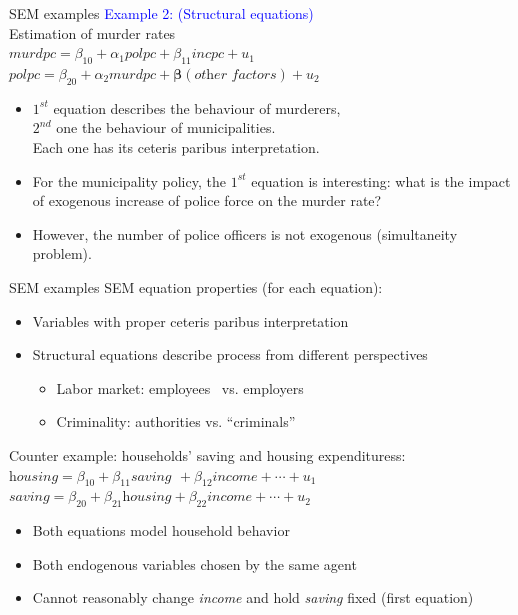 \documentclass[usenames,dvipsnames]{beamer}
\begin{document}
\begin{frame}{SEM examples}
\textcolor{Blue}{Example 2: (Structural equations)} \\Estimation of murder rates\\
\medskip
\qquad $\textit{murdpc} = \beta_{10} + \alpha_1 \textit{polpc} +  \beta_{11} \textit{incpc} + u_1$ \\
\qquad \hspace{0.25cm} $\textit{polpc} = \beta_{20} + \alpha_2 \textit{murdpc} + \bm{\beta} (\textit{other factors}) + u_2$ \\
\medskip
\begin{itemize}
\item $1^{st}$ equation describes the behaviour of murderers, \\$2^{nd}$ one the behaviour of municipalities. \\Each one has its ceteris paribus interpretation.\\
\medskip
\item For the municipality policy, the $1^{st}$ equation is interesting: what is the impact of exogenous increase of police force on the murder rate? 
\item However, the number of police officers  is not exogenous (simultaneity problem). 
\end{itemize}
\end{frame}
\begin{frame}{SEM examples}
SEM equation properties (for each equation):\\
\smallskip
\begin{itemize}
\item Variables with proper ceteris paribus interpretation
\item Structural equations describe process from different perspectives\\
\begin{itemize}
    \item Labor market: employees \quad ~vs. \quad employers
    \item Criminality: \quad authorities \quad vs. \quad ``criminals''
\end{itemize}
\end{itemize} \bigskip
\small
Counter example: households' saving and housing expendituress:\\
\medskip
\qquad $\textit{housing} = \beta_{10} + \beta_{11} \textit{saving} ~\,+  \beta_{12} \textit{income} + \cdots + u_1$ \\
\qquad \hspace{0.07cm} $\textit{saving} = \beta_{20} +\beta_{21} \textit{housing} +  \beta_{22} \textit{income} + \cdots + u_2$ \\
\medskip
\begin{itemize}
    \item Both equations model household behavior
    \item Both endogenous variables chosen by the same agent
    \item Cannot reasonably change \textit{income} and hold \textit{saving} fixed (first equation)
\end{itemize}
\end{frame}
\end{document}
